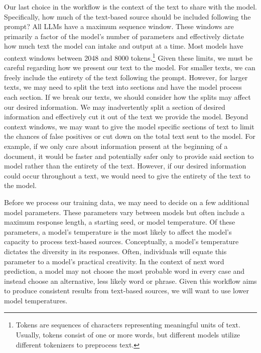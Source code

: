     Our last choice in the workflow is the context of the text to share with the model. Specifically, how much of the text-based source should be included following the prompt? All LLMs have a maximum sequence window. These windows are primarily a factor of the model's number of parameters and effectively dictate how much text the model can intake and output at a time. Most models have context windows between 2048 and 8000 tokens.\footnote{Tokens are sequences of characters representing meaningful units of text. Usually, tokens consist of one or more words, but different models utilize different tokenizers to preprocess text.} Given these limits, we must be careful regarding how we present our text to the model. For smaller texts, we can freely include the entirety of the text following the prompt. However, for larger texts, we may need to split the text into sections and have the model process each section. If we break our texts, we should consider how the splits may affect our desired information. We may inadvertently split a section of desired information and effectively cut it out of the text we provide the model. Beyond context windows, we may want to give the model specific sections of text to limit the chances of false positives or cut down on the total text sent to the model. For example, if we only care about information present at the beginning of a document, it would be faster and potentially safer only to provide said section to model rather than the entirety of the text. However, if our desired information could occur throughout a text, we would need to give the entirety of the text to the model.

    Before we process our training data, we may need to decide on a few additional model parameters. These parameters vary between models but often include a maximum response length, a starting seed, or model temperature. Of these parameters, a model's temperature is the most likely to affect the model's capacity to process text-based sources. Conceptually, a model's temperature dictates the diversity in its responses. Often, individuals will equate this parameter to a model's practical creativity. In the context of next word prediction, a model may not choose the most probable word in every case and instead choose an alternative, less likely word or phrase. Given this workflow aims to produce consistent results from text-based sources, we will want to use lower model temperatures.

